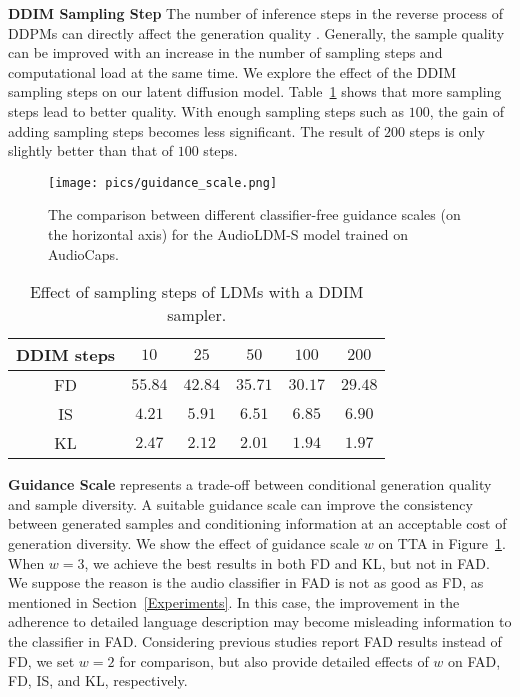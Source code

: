 \textbf{DDIM Sampling Step} The number of inference steps in the reverse process of DDPMs can directly affect the generation quality \cite{DDPM,SGM}. Generally, the sample quality can be improved with an increase in the number of sampling steps and computational load at the same time. We explore the effect of the DDIM~\cite{song2020denoising} sampling steps on our latent diffusion model. Table~\ref{tab: DDIMsampling} shows that more sampling steps lead to better quality. With enough sampling steps such as $100$, the gain of adding sampling steps becomes less significant. The result of $200$ steps is only slightly better than that of $100$ steps.

\begin{figure}[tbp]
    \centering
    \texttt{[image: pics/guidance\_scale.png]}
    \caption{The comparison between different classifier-free guidance scales (on the horizontal axis) for the AudioLDM-S model trained on AudioCaps.}
    \label{fig:classifier-free-guidance}
    \vspace{-2mm}
\end{figure}

\begin{table}[tbp]
\centering
\small
\begin{tabular}{cccccc}
\toprule
  DDIM steps    & $10$    & $25$      & $50$     & $100$     & $200$   \\
\midrule
FD    &   $55.84$    &    $42.84$     &    $35.71$    &    $30.17$     &   $\mathbf{29.48}$    \\
IS    &   $4.21$    &    $5.91$     &   $6.51$     &    $6.85$     & 
 $\mathbf{6.90} $      \\ %
KL    &   $2.47$    &    $2.12$     &   $2.01$     &    $\mathbf{1.94}$     & $1.97$      \\
\bottomrule
\end{tabular}
\caption{Effect of sampling steps of LDMs with a DDIM sampler.}
\label{tab: DDIMsampling}
\vspace{-6mm}
\end{table}

\textbf{Guidance Scale} 
represents a trade-off between conditional generation quality and sample diversity. A suitable guidance scale can improve the consistency between generated samples and conditioning information at an acceptable cost of generation diversity. We show the effect of guidance scale $w$ on TTA in Figure~\ref{fig:classifier-free-guidance}. When $w=3$, we achieve the best results in both FD and KL, but not in FAD. We suppose the reason is the audio classifier in FAD is not as good as FD, as mentioned in Section~\ref{Experiments}. In this case, the improvement in the adherence to detailed language description may become misleading information to the classifier in FAD. Considering previous studies report FAD results instead of FD, we set $w=2$ for comparison, but also provide detailed effects of $w$ on FAD, FD, IS, and KL, respectively. 

